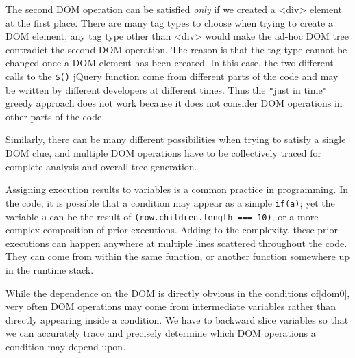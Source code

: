 

The second DOM operation can be satisfied {\em only} if we created a <div> element at the first place.  
There are many tag types to choose when trying to create a DOM element; any tag type other than <div> would make the ad-hoc DOM tree contradict the second DOM operation.  
The reason is that the tag type cannot be changed once a DOM element has been created.  
In this case, the two different calls to the {\tt \$()} jQuery function come from different parts of the code and may be written by different developers at different times.  
Thus the {\tt "}just in time{\tt "} greedy approach does not work because it does not consider DOM operations in other parts of the code.  

Similarly, there can be many different possibilities when trying to satisfy a single DOM clue, and multiple DOM operations have to be collectively traced for complete analysis and overall tree generation.   

Assigning execution results to variables is a common practice in programming.  
In the code, it is possible that a condition may appear as a simple {\tt if(a)}; yet the variable {\tt a} can be the result of {\tt (row.children.length === 10)}, or a more complex composition of prior executions. 
Adding to the complexity, these prior executions can happen anywhere at multiple lines scattered throughout the code.  
They can come from within the same function, or another function somewhere up in the runtime stack.

While the dependence on the DOM is directly obvious in the conditions of\autoref{dom0}, very often DOM operations may come from intermediate variables rather than directly appearing inside a condition.  
We have to backward slice variables so that we can accurately trace and precisely determine which DOM operations a condition may depend upon.  

